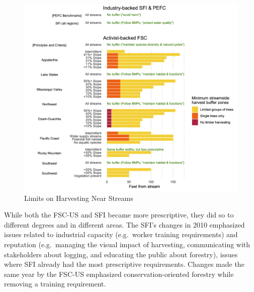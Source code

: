 \documentclass[
      12pt,
            Review ]{article}
\begin{document}
\begin{figure}
\centering
\includegraphics{Figs/riparian-1.png}
\caption{Limits on Harvesting Near Streams}
\end{figure}



While both the FSC-US and SFI became more prescriptive, they did so to
different degrees and in different areas. The SFI's changes in 2010
emphasized issues related to industrial capacity (e.g.~worker training
requirements) and reputation (e.g.~managing the visual impact of
harvesting, communicating with stakeholders about logging, and educating
the public about forestry), issues where SFI already had the most
prescriptive requirements. Changes made the same year by the FSC-US
emphasized conservation-oriented forestry while removing a training
requirement.
\end{document}
